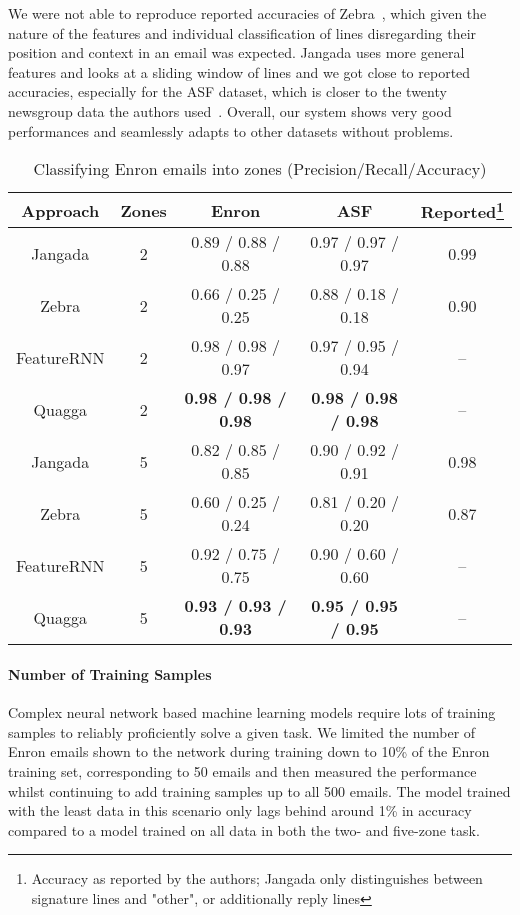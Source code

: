 \documentclass{llncs}
\begin{document}
We were not able to reproduce reported accuracies of Zebra~\cite{zebra}, which given the nature of the features and individual classification of lines disregarding their position and context in an email was expected.
Jangada uses more general features and looks at a sliding window of lines and we got close to reported accuracies, especially for the ASF dataset, which is closer to the twenty newsgroup data the authors used~\cite{zones}.
Overall, our system shows very good performances and seamlessly adapts to other datasets without problems.

\begin{table}
	\centering
	\caption{Classifying Enron emails into zones (Precision/Recall/Accuracy)}
	\label{tab:results-comp}
	\begin{tabular*}{\textwidth}{@{\extracolsep{\fill}}ccccc}
		\toprule
		Approach                & Zones & Enron & ASF & Reported\footnote{Accuracy as reported by the authors; Jangada only distinguishes between signature lines and "other", or additionally reply lines}\\ \midrule
		Jangada\cite{signature} & 2 & 0.89 / 0.88 / 0.88 & 0.97 / 0.97 / 0.97 & 0.99 \\
		Zebra\cite{zones}       & 2 & 0.66 / 0.25 / 0.25 & 0.88 / 0.18 / 0.18 & 0.90 \\
		FeatureRNN              & 2 & 0.98 / 0.98 / 0.97 & 0.97 / 0.95 / 0.94 & --   \\
		Quagga                  & 2 & \textbf{0.98 / 0.98 / 0.98} & \textbf{0.98 / 0.98 / 0.98} & --   \\
		\midrule
		Jangada\cite{signature} & 5 & 0.82 / 0.85 / 0.85 & 0.90 / 0.92 / 0.91 & 0.98 \\
		Zebra\cite{zones}       & 5 & 0.60 / 0.25 / 0.24 & 0.81 / 0.20 / 0.20 & 0.87 \\
		FeatureRNN              & 5 & 0.92 / 0.75 / 0.75 & 0.90 / 0.60 / 0.60 & -- \\
		Quagga                  & 5 & \textbf{0.93 / 0.93 / 0.93} & \textbf{0.95 / 0.95 / 0.95} & -- \\
		\bottomrule	
	\end{tabular*}
\end{table}

\paragraph{Number of Training Samples}
Complex neural network based machine learning models require lots of training samples to reliably proficiently solve a given task.
We limited the number of Enron emails shown to the network during training down to 10\% of the Enron training set, corresponding to 50 emails and then measured the performance whilst continuing to add training samples up to all 500 emails.
The model trained with the least data in this scenario only lags behind around 1\% in accuracy compared to a model trained on all data in both the two- and five-zone task.
\end{document}
